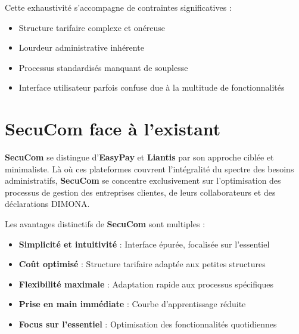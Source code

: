 \begin{tcolorbox}[
  title={\textbf{Contraintes pour les petites structures}},
  colback=blue!5!white,
  colframe=primarycolor,
  fonttitle=\bfseries,
  boxrule=0.5mm,
  arc=2mm,
  left=6mm,
  right=6mm,
  top=6mm,
  bottom=6mm
]
\noindent Cette exhaustivité s'accompagne de contraintes significatives :
\begin{itemize}[leftmargin=*,label=\textcolor{darkgray}{$\bullet$},itemsep=0.3em]
  \item Structure tarifaire complexe et onéreuse
  \item Lourdeur administrative inhérente
  \item Processus standardisés manquant de souplesse
  \item Interface utilisateur parfois confuse due à la multitude de fonctionnalités
\end{itemize}
\end{tcolorbox}

\newpage
\section{SecuCom face à l'existant}

\noindent \textbf{SecuCom} se distingue d'\textbf{EasyPay} et \textbf{Liantis} par son approche ciblée et minimaliste. Là où ces plateformes couvrent l'intégralité du spectre des besoins administratifs, \textbf{SecuCom} se concentre exclusivement sur l'optimisation des processus de gestion des entreprises clientes, de leurs collaborateurs et des déclarations DIMONA.

\begin{tcolorbox}[
  title={\textbf{Avantages distinctifs de SecuCom}},
  colback=blue!5!white,
  colframe=primarycolor,
  fonttitle=\bfseries,
  boxrule=0.5mm,
  arc=2mm,
  left=6mm,
  right=6mm,
  top=6mm,
  bottom=6mm
]
\noindent Les avantages distinctifs de \textbf{SecuCom} sont multiples :

\begin{itemize}[leftmargin=*,label=\textcolor{darkgray}{$\bullet$},itemsep=0.3em]
  \item \textbf{Simplicité et intuitivité} : Interface épurée, focalisée sur l'essentiel
  \item \textbf{Coût optimisé} : Structure tarifaire adaptée aux petites structures
  \item \textbf{Flexibilité maximale} : Adaptation rapide aux processus spécifiques
  \item \textbf{Prise en main immédiate} : Courbe d'apprentissage réduite
  \item \textbf{Focus sur l'essentiel} : Optimisation des fonctionnalités quotidiennes
\end{itemize}
\end{tcolorbox}

